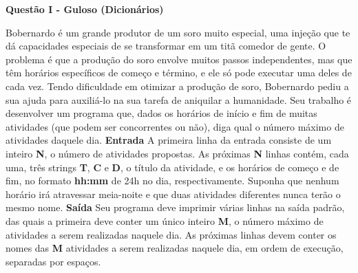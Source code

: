 \documentclass[a4paper, 12pt]{article}
\begin{document}
\newpage %
\begin{center}
\textbf{{\Large Questão I - Guloso (Dicionários)}}
\end{center}
\vspace{5pt}
Bobernardo é um grande produtor de um soro muito especial, uma injeção que te
dá capacidades especiais de se transformar em um titã comedor de gente. O
problema é que a produção do soro envolve muitos passos independentes, mas
que têm horários específicos de começo e término, e ele só pode executar uma
deles de cada vez. \newline \newline
Tendo dificuldade em otimizar a produção de soro, Bobernardo pediu a sua ajuda
para auxiliá-lo na sua tarefa de aniquilar a humanidade. Seu trabalho é desenvolver um programa que, dados os horários de início e fim de muitas atividades (que podem ser concorrentes ou não), diga qual o número
máximo de atividades daquele dia.
\newline \newline
\textbf{{\large Entrada}} \newline
A primeira linha da entrada consiste de um inteiro \textbf{N}, o número de atividades
propostas. As próximas \textbf{N} linhas contém, cada uma, três strings \textbf{T}, \textbf{C} e \textbf{D}, o título da atividade, e os horários de começo e de fim, no formato \textbf{hh:mm} de 24h no dia, respectivamente. Suponha que nenhum horário irá atravessar meia-noite e que duas atividades diferentes nunca terão o mesmo nome.
\newline \newline
\textbf{{\large Saída}} \newline
Seu programa deve imprimir várias linhas na saída padrão, das quais a primeira
deve conter um único inteiro \textbf{M}, o número máximo de atividades a serem
realizadas naquele dia. As próximas linhas devem conter os nomes das \textbf{M} atividades a serem realizadas naquele dia, em ordem de execução, separadas por espaços.
\newline
\end{document}
